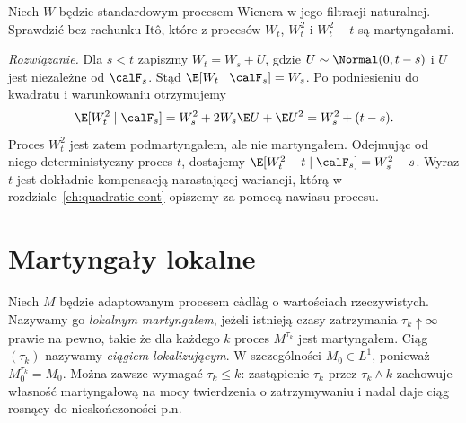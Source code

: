 \begin{zadanie}
Niech $W$ będzie standardowym procesem Wienera w jego
filtracji naturalnej. Sprawdzić bez rachunku It\^o, które
z procesów $W_t$, $W_t^2$ i $W_t^2-t$ są martyngałami.

\emph{Rozwiązanie.} Dla $s<t$ zapiszmy
$W_t=W_s+U$, gdzie $U\sim\Normal(0,t-s)$
i $U$ jest niezależne od $\calF_s$.
Stąd $\E[W_t\mid\calF_s]=W_s$.
Po podniesieniu do kwadratu i warunkowaniu otrzymujemy
\[
\E[W_t^2\mid\calF_s]
=W_s^2+2W_s\E U+\E U^2=W_s^2+(t-s).
\]
Proces $W_t^2$ jest zatem podmartyngałem, ale nie
martyngałem. Odejmując od niego deterministyczny
proces $t$, dostajemy
$\E[W_t^2-t\mid\calF_s]=W_s^2-s$.
Wyraz $t$ jest dokładnie kompensacją narastającej
wariancji, którą w rozdziale~\ref{ch:quadratic-cont}
opiszemy za pomocą nawiasu procesu.
\end{zadanie}

\section{Martyngały lokalne}
\begin{definicja}
Niech $M$ będzie adaptowanym procesem c\`adl\`ag o
wartościach rzeczywistych. Nazywamy go \emph{lokalnym
martyngałem}, jeżeli istnieją czasy zatrzymania
$\tau_k\uparrow\infty$ prawie na pewno, takie że dla
każdego $k$ proces $M^{\tau_k}$ jest martyngałem.
Ciąg $(\tau_k)$ nazywamy \emph{ciągiem lokalizującym}.
W szczególności $M_0\in L^1$, ponieważ
$M^{\tau_k}_0=M_0$. Można zawsze wymagać
$\tau_k\le k$: zastąpienie $\tau_k$ przez
$\tau_k\wedge k$ zachowuje własność martyngałową
na mocy twierdzenia o zatrzymywaniu i nadal daje
ciąg rosnący do nieskończoności p.n.
\end{definicja}

